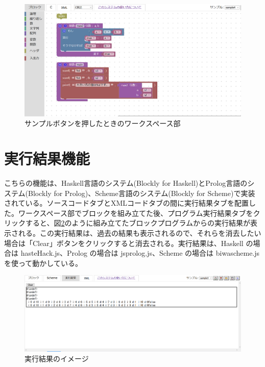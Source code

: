\documentclass{risepaper}
\begin{document}
\begin{figure}[h]
\begin{center}
\includegraphics[scale=0.5]{img/sample.PNG}
\caption{サンプルボタンを押したときのワークスペース部}%
\label{fig:sample}
\end{center}%
\end{figure}%

   \section{実行結果機能}
   
こちらの機能は、Haskell言語のシステム(Blockly for Haskell)とProlog言語のシステム(Blockly for Prolog)、Scheme言語のシステム(Blockly for Scheme)で実装されている。ソースコードタブとXMLコードタブの間に実行結果タブを配置した。ワークスペース部でブロックを組み立てた後、プログラム実行結果タブをクリックすると、図\ref{fig:excution_result}のように組み立てたブロックプログラムからの実行結果が表示される。この実行結果は、過去の結果も表示されるので、それらを消去したい場合は「Clear」ボタンをクリックすると消去される。実行結果は、Haskell の場合は hasteHack.js、Prolog の場合は jsprolog.js、Scheme の場合は biwascheme.js を使って動かしている。

\begin{figure}[h]
\begin{center}
\includegraphics[scale=0.5]{img/execution_result.PNG}
\caption{実行結果のイメージ}%
\label{fig:excution_result}
\end{center}%
\end{figure}%
\end{document}
